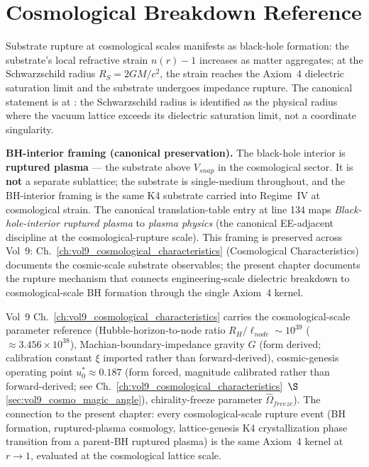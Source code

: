 \section{Cosmological Breakdown Reference}
\label{sec:vol9_cosmological_breakdown}

Substrate rupture at cosmological scales manifests as black-hole formation: the substrate's local refractive strain $n(r) - 1$ increases as matter aggregates; at the Schwarzschild radius $R_S = 2GM/c^2$, the strain reaches the Axiom~4 dielectric saturation limit and the substrate undergoes impedance rupture. The canonical statement is at : the Schwarzschild radius is identified as the physical radius where the vacuum lattice exceeds its dielectric saturation limit, not a coordinate singularity.

\textbf{BH-interior framing (canonical preservation).} The black-hole interior is \textbf{ruptured plasma} --- the substrate above $V_{snap}$ in the cosmological sector. It is \textbf{not} a separate sublattice; the substrate is single-medium throughout, and the BH-interior framing is the same K4 substrate carried into Regime~IV at cosmological strain. The canonical translation-table entry at  line 134 maps \emph{Black-hole-interior ruptured plasma} to \emph{plasma physics} (the canonical EE-adjacent discipline at the cosmological-rupture scale). This framing is preserved across Vol~9: Ch.~\ref{ch:vol9_cosmological_characteristics} (Cosmological Characteristics) documents the cosmic-scale substrate observables; the present chapter documents the rupture mechanism that connects engineering-scale dielectric breakdown to cosmological-scale BH formation through the single Axiom~4 kernel.

Vol~9 Ch.~\ref{ch:vol9_cosmological_characteristics} carries the cosmological-scale parameter reference (Hubble-horizon-to-node ratio $R_H/\ell_{node} \sim 10^{39}$ ($\approx 3.456\times10^{38}$), Machian-boundary-impedance gravity $G$ (form derived; calibration constant $\xi$ imported rather than forward-derived), cosmic-genesis operating point $u_0^* \approx 0.187$ (form forced, magnitude calibrated rather than forward-derived; see Ch.~\ref{ch:vol9_cosmological_characteristics}~$\S$\ref{sec:vol9_cosmo_magic_angle}), chirality-freeze parameter $\hat{\Omega}_{freeze}$). The connection to the present chapter: every cosmological-scale rupture event (BH formation, ruptured-plasma cosmology, lattice-genesis K4 crystallization phase transition from a parent-BH ruptured plasma) is the same Axiom~4 kernel at $r \to 1$, evaluated at the cosmological lattice scale.

